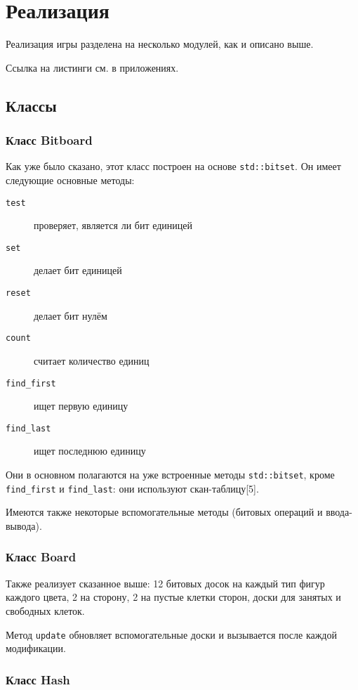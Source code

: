 \chapter{Реализация}

Реализация игры разделена на несколько модулей, как и описано выше. 

Ссылка на листинги см. в приложениях.

\section{Классы}

\subsection*{Класс Bitboard}

Как уже было сказано, этот класс построен на основе \texttt{std::bitset}. Он имеет следующие основные методы:
\begin{description}
	\item[\texttt{test}] проверяет, является ли бит единицей
	\item[\texttt{set}] делает бит единицей
	\item[\texttt{reset}] делает бит нулём
	\item[\texttt{count}] считает количество единиц
	\item[\texttt{find\_first}] ищет первую единицу
	\item[\texttt{find\_last}] ищет последнюю единицу
\end{description}

Они в основном полагаются на уже встроенные методы \texttt{std::bitset}, кроме \texttt{find\_first} и \texttt{find\_last}: они используют скан-таблицу[5].

Имеются также некоторые вспомогательные методы (битовых операций и ввода-вывода).

\subsection*{Класс Board}

Также реализует сказанное выше: 12 битовых досок на каждый тип фигур каждого цвета, 2 на сторону, 2 на пустые клетки сторон, доски для занятых и свободных клеток. 

Метод \texttt{update} обновляет вспомогательные доски и вызывается после каждой модификации.

\subsection*{Класс Hash}


